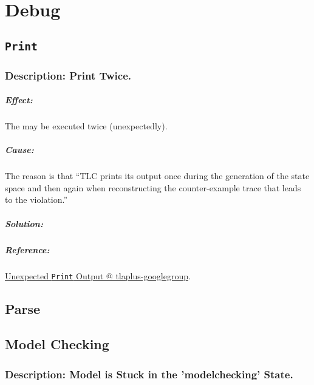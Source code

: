 \chapter{Debug}	\label{chapter:debug}

\section{\texttt{Print}}	\label{section:print}

\subsection{Description: Print Twice.}

\paragraph{Effect:}
The  may be executed twice (unexpectedly).

\paragraph{Cause:}
The reason is that ``TLC prints its output once during the generation of the state space 
and then again when reconstructing the counter-example trace that leads to the violation.''

\paragraph{Solution:}

\paragraph{Reference:} 
\href{https://groups.google.com/forum/#!topic/tlaplus/xUTjiMq3s3E}
{Unexpected \texttt{Print} Output @ tlaplus-googlegroup}.

\section{Parse}	\label{section:parse}

\section{Model Checking}	\label{section:mc}

\subsection{Description: Model is Stuck in the 'modelchecking' State.}

